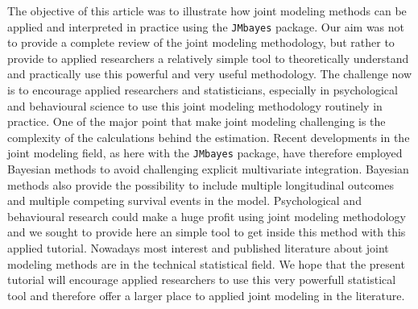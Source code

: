 \documentclass[12pt]{article}
\begin{document}
The objective of this article was to illustrate how joint modeling methods can be applied and interpreted in practice using the \texttt{JMbayes} package. Our aim was not to provide a complete review of the joint modeling methodology, but rather to provide to applied researchers a relatively simple tool to theoretically understand and practically use this powerful and very useful methodology. 
The challenge now is to encourage applied researchers and statisticians, especially in psychological and behavioural science to use this joint modeling methodology routinely in practice.
One of the major point that make joint modeling challenging is the complexity of the calculations behind the estimation. Recent developments in the joint modeling field, as here with the \texttt{JMbayes} package, have therefore employed Bayesian methods to avoid challenging explicit multivariate integration. Bayesian methods also provide the possibility to include multiple longitudinal outcomes and multiple competing survival events in the model. Psychological and behavioural research could make a huge profit using joint modeling methodology and we sought to provide here an simple tool to get inside this method with this applied tutorial. Nowadays most interest and published literature about joint modeling methods are in the technical statistical field. We hope that the present tutorial will encourage applied researchers to use this very powerfull statistical tool and therefore offer a larger place to applied joint modeling in the literature.

\clearpage

\end{document}
